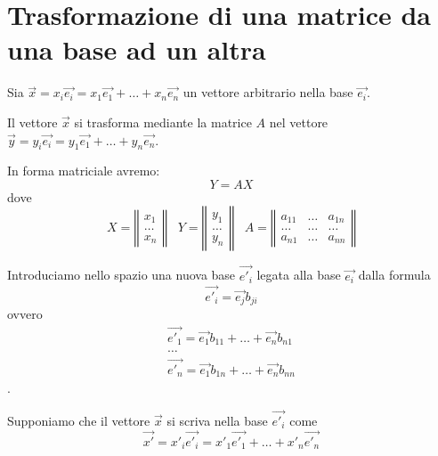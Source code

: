 \item \section{Trasformazione di una matrice da una base ad un altra}

Sia $\vec{x}=x_i \vec{e_i}=x_1 \vec{e_1}+\dots+x_n\vec{e_n}$ un vettore arbitrario nella base $\vec{e_i}$.

Il vettore $\vec{x}$ si trasforma mediante la matrice $A$ nel vettore $\vec{y}=y_i \vec{e_i}=y_1 \vec{e_1}+\dots+y_n\vec{e_n}$.

In forma matriciale avremo:
\begin{equation}
  Y=AX
  \label{equno:cambiobase.1}
\end{equation}
dove
\begin{displaymath}
  X=
  \left\Vert
  \begin{array}{l}
    x_1\\ \dots\\x_n
  \end{array}
  \right\Vert
  \;\;\;
  Y=
  \left\Vert
  \begin{array}{l}
    y_1\\ \dots\\y_n
  \end{array}
  \right\Vert
  \;\;\;
  A=
  \left\Vert
  \begin{array}{lll}
    a_{11}&\dots&a_{1n}\\
    \dots&\dots&\dots\\
    a_{n1}&\dots&a_{nn}
  \end{array}
  \right\Vert
\end{displaymath}

Introduciamo nello spazio una nuova base $\vec{e'_i}$ legata alla base $\vec{e_i}$ dalla formula
\begin{equation}
  \vec{e'_i}=\vec{e_j} b_{ji}  
  \label{equno:cambiobase.2}
\end{equation}
ovvero
\begin{displaymath}
  \begin{array}{l}
    \vec{e'_1}=\vec{e_1} b_{11}+\dots+\vec{e_n} b_{n1}
    \\
    \dots
    \\
    \vec{e'_n}=\vec{e_1} b_{1n}+\dots+\vec{e_n} b_{nn}
  \end{array}
\end{displaymath}.

Supponiamo che il vettore $\vec{x}$ si scriva nella base $\vec{e'_i}$ come
\begin{displaymath}
  \vec{x'}=x'_i\vec{e'_i}=x'_1\vec{e'_1}+\dots+x'_n\vec{e'_n}
\end{displaymath}

